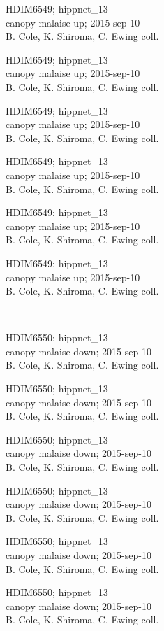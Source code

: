 \documentclass[2pt]{extarticle}
\begin{document}
\noindent
\parbox{0.16\textwidth}{\tiny \raggedright \rule[-0.3\baselineskip]{0pt}{10pt}HDIM6549; hippnet\_13\\ canopy malaise up; 2015-sep-10\\ B. Cole, K. Shiroma, C. Ewing coll.}
\parbox{0.16\textwidth}{\tiny \raggedright \rule[-0.3\baselineskip]{0pt}{10pt}HDIM6549; hippnet\_13\\ canopy malaise up; 2015-sep-10\\ B. Cole, K. Shiroma, C. Ewing coll.}
\parbox{0.16\textwidth}{\tiny \raggedright \rule[-0.3\baselineskip]{0pt}{10pt}HDIM6549; hippnet\_13\\ canopy malaise up; 2015-sep-10\\ B. Cole, K. Shiroma, C. Ewing coll.}
\parbox{0.16\textwidth}{\tiny \raggedright \rule[-0.3\baselineskip]{0pt}{10pt}HDIM6549; hippnet\_13\\ canopy malaise up; 2015-sep-10\\ B. Cole, K. Shiroma, C. Ewing coll.}
\parbox{0.16\textwidth}{\tiny \raggedright \rule[-0.3\baselineskip]{0pt}{10pt}HDIM6549; hippnet\_13\\ canopy malaise up; 2015-sep-10\\ B. Cole, K. Shiroma, C. Ewing coll.}
\parbox{0.16\textwidth}{\tiny \raggedright \rule[-0.3\baselineskip]{0pt}{10pt}HDIM6549; hippnet\_13\\ canopy malaise up; 2015-sep-10\\ B. Cole, K. Shiroma, C. Ewing coll.} \\ 
\vspace{0.001in} 

\noindent
\parbox{0.16\textwidth}{\tiny \raggedright \rule[-0.3\baselineskip]{0pt}{10pt}HDIM6550; hippnet\_13\\ canopy malaise down; 2015-sep-10\\ B. Cole, K. Shiroma, C. Ewing coll.}
\parbox{0.16\textwidth}{\tiny \raggedright \rule[-0.3\baselineskip]{0pt}{10pt}HDIM6550; hippnet\_13\\ canopy malaise down; 2015-sep-10\\ B. Cole, K. Shiroma, C. Ewing coll.}
\parbox{0.16\textwidth}{\tiny \raggedright \rule[-0.3\baselineskip]{0pt}{10pt}HDIM6550; hippnet\_13\\ canopy malaise down; 2015-sep-10\\ B. Cole, K. Shiroma, C. Ewing coll.}
\parbox{0.16\textwidth}{\tiny \raggedright \rule[-0.3\baselineskip]{0pt}{10pt}HDIM6550; hippnet\_13\\ canopy malaise down; 2015-sep-10\\ B. Cole, K. Shiroma, C. Ewing coll.}
\parbox{0.16\textwidth}{\tiny \raggedright \rule[-0.3\baselineskip]{0pt}{10pt}HDIM6550; hippnet\_13\\ canopy malaise down; 2015-sep-10\\ B. Cole, K. Shiroma, C. Ewing coll.}
\parbox{0.16\textwidth}{\tiny \raggedright \rule[-0.3\baselineskip]{0pt}{10pt}HDIM6550; hippnet\_13\\ canopy malaise down; 2015-sep-10\\ B. Cole, K. Shiroma, C. Ewing coll.} \\ 
\vspace{0.001in} 
\end{document}
